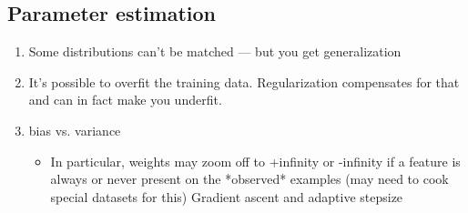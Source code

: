 \documentclass[11pt,letterpaper]{article}
\begin{document}
\subsection{Parameter estimation}
\begin{enumerate}[resume]
\item Some distributions can't be matched --- but you get generalization
\item It's possible to overfit the training data.  Regularization compensates for that and can in fact make you underfit.
\item bias vs. variance
\begin{itemize}
\item In particular, weights may zoom off to +infinity or -infinity if a feature is always or never present on the *observed* examples (may need to cook special datasets for this)
Gradient ascent and adaptive stepsize
\end{itemize}
\end{enumerate}
\end{document}
